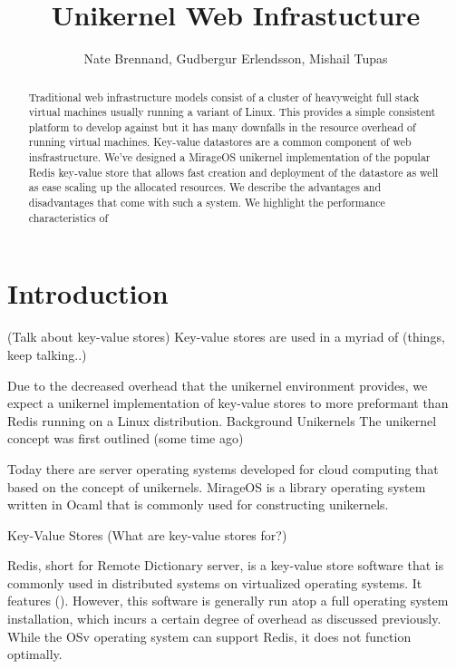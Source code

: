 \documentclass[english,10pt,twocolumn]{article}
\begin{document}
\title{Unikernel Web Infrastucture}
\author{Nate Brennand, Gudbergur Erlendsson, Mishail Tupas}
\date{}
\maketitle
\thispagestyle{empty}

\begin{abstract}
  Traditional web infrastructure models consist of a cluster of heavyweight full stack virtual machines usually running a variant of Linux.
  This provides a simple consistent platform to develop against but it has many downfalls in the resource overhead of running virtual machines.
  Key-value datastores are a common component of web insfrastructure.
  We've designed a MirageOS\cite{mirage} unikernel implementation of the popular Redis key-value store that allows fast creation and deployment of the datastore as well as ease scaling up the allocated resources.
  We describe the advantages and disadvantages that come with such a system.
  We highlight the performance characteristics of 
\end{abstract}

\section{Introduction}






(Talk about key-value stores) Key-value stores are used in a myriad of (things, keep talking..)

Due to the decreased overhead that the unikernel environment provides, we expect a unikernel implementation of key-value stores to more preformant than Redis running on a Linux distribution. 
Background
Unikernels
The unikernel concept was first outlined (some time ago)

Today there are server operating systems developed for cloud computing that based on the concept of unikernels. MirageOS is a library operating system written in Ocaml that is commonly used for constructing unikernels.

Key-Value Stores
(What are key-value stores for?) 

Redis, short for Remote Dictionary server, is a key-value store software that is commonly used in distributed systems on virtualized operating systems. It features (). However, this software is generally run atop a full operating system installation, which incurs a certain degree of overhead as discussed previously.  While the OSv operating system can support Redis, it does not function optimally.
\end{document}
